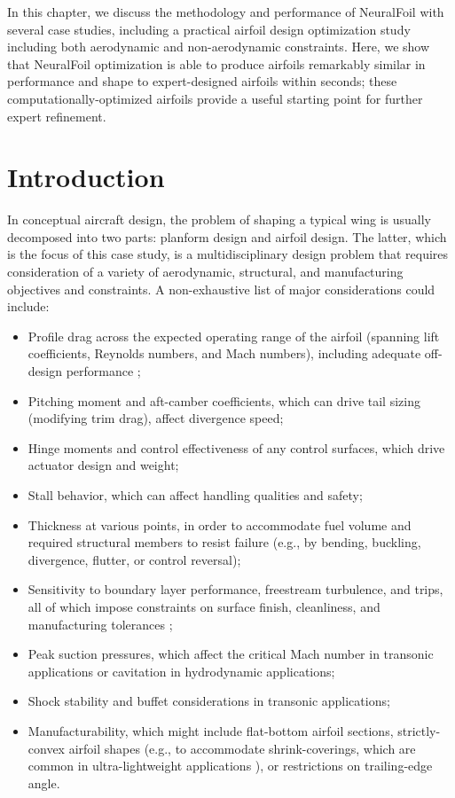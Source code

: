In this chapter, we discuss the methodology and performance of NeuralFoil with several case studies, including a practical airfoil design optimization study including both aerodynamic and non-aerodynamic constraints. Here, we show that NeuralFoil optimization is able to produce airfoils remarkably similar in performance and shape to expert-designed airfoils within seconds; these computationally-optimized airfoils provide a useful starting point for further expert refinement.


\section{Introduction}

In conceptual aircraft design, the problem of shaping a typical wing is usually decomposed into two parts: planform design and airfoil design. The latter, which is the focus of this case study, is a multidisciplinary design problem that requires consideration of a variety of aerodynamic, structural, and manufacturing objectives and constraints. A non-exhaustive list of major considerations could include:
\begin{itemize}
    \item Profile drag across the expected operating range of the airfoil (spanning lift coefficients, Reynolds numbers, and Mach numbers), including adequate off-design performance \cite{drela_pros_1998};
    \item Pitching moment and aft-camber coefficients, which can drive tail sizing (modifying trim drag), affect divergence speed;
    \item Hinge moments and control effectiveness of any control surfaces, which drive actuator design and weight;
    \item Stall behavior, which can affect handling qualities and safety;
    \item Thickness at various points, in order to accommodate fuel volume and required structural members to resist failure (e.g., by bending, buckling, divergence, flutter, or control reversal);\cite{sharpe_tailerons_2023}
    \item Sensitivity to boundary layer performance, freestream turbulence, and trips, all of which impose constraints on surface finish, cleanliness, and manufacturing tolerances \cite{eleshaky1993airfoil, selig_highlift_1997, liebeck1973class};
    \item Peak suction pressures, which affect the critical Mach number in transonic applications or cavitation in hydrodynamic applications;
    \item Shock stability and buffet considerations in transonic applications;
    \item Manufacturability, which might include flat-bottom airfoil sections, strictly-convex airfoil shapes (e.g., to accommodate shrink-coverings, which are common in ultra-lightweight applications \cite{drela_lowreynoldsnumber_1988}), or restrictions on trailing-edge angle.
\end{itemize}

